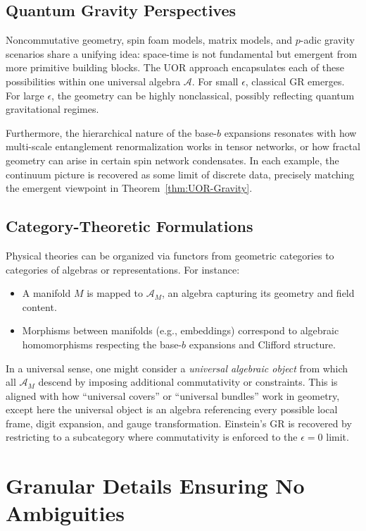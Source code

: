 \documentclass[11pt]{article}
\begin{document}
\subsection{Quantum Gravity Perspectives}
Noncommutative geometry, spin foam models, matrix models, and $p$-adic gravity scenarios share a unifying idea: space-time is not fundamental but emergent from more primitive building blocks. The UOR approach encapsulates each of these possibilities within one universal algebra $\mathcal{A}$. For small $\epsilon$, classical GR emerges. For large $\epsilon$, the geometry can be highly nonclassical, possibly reflecting quantum gravitational regimes. 

Furthermore, the hierarchical nature of the base-$b$ expansions resonates with how multi-scale entanglement renormalization works in tensor networks, or how fractal geometry can arise in certain spin network condensates. In each example, the continuum picture is recovered as some limit of discrete data, precisely matching the emergent viewpoint in Theorem~\ref{thm:UOR-Gravity}.

\subsection{Category-Theoretic Formulations}
Physical theories can be organized via functors from geometric categories to categories of algebras or representations. For instance:
\begin{itemize}
\item A manifold $M$ is mapped to $\mathcal{A}_M$, an algebra capturing its geometry and field content.
\item Morphisms between manifolds (e.g., embeddings) correspond to algebraic homomorphisms respecting the base-$b$ expansions and Clifford structure.
\end{itemize}
In a universal sense, one might consider a \emph{universal algebraic object} from which all $\mathcal{A}_M$ descend by imposing additional commutativity or constraints. This is aligned with how “universal covers” or “universal bundles” work in geometry, except here the universal object is an algebra referencing every possible local frame, digit expansion, and gauge transformation. Einstein’s GR is recovered by restricting to a subcategory where commutativity is enforced to the $\epsilon=0$ limit.

\section{Granular Details Ensuring No Ambiguities}
\label{sec:granular-details}
\end{document}
